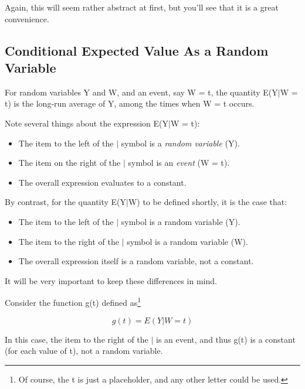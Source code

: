 Again, this will seem rather abstract at first, but you'll see that it
is a great convenience.

\subsection{Conditional Expected Value As a Random Variable}

For random variables Y and W, and an event, say W = t, the quantity
E(Y$|$W = t) is the long-run average of Y, among the times when W = t
occurs.  

Note several things about the expression E(Y$|$W = t):

\begin{itemize}

\item The item to the left of the $|$ symbol is a {\it random variable} (Y).

\item The item on the right of the $|$ symbol is an {\it event} (W = t).

\item The overall expression evaluates to a constant.

\end{itemize}

By contrast, for the quantity E(Y$|$W) to be defined shortly,
it is the case that:

\begin{itemize}

\item The item to the left of the $|$ symbol is a random variable (Y).

\item The item to the right of the $|$ symbol is a random variable (W).

\item The overall expression itself is a random variable, not a constant.

\end{itemize}

It will be very important to keep these differences in mind.

Consider the function g(t) defined as\footnote{Of course, the t is just
a placeholder, and any other letter could be used.} 

\begin{equation}
\label{thisisg}
g(t)=E(Y|W=t)
\end{equation}

In this case, the item to the right of the $|$ is an event, and thus
g(t) is a constant (for each value of t), not a random variable.

